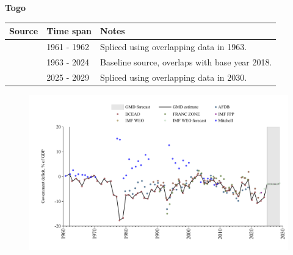 \documentclass[12pt,a4paper,landscape]{article}
\begin{document}
\begin{adjustbox}{max totalsize={\paperwidth}{\paperheight},center}
\begin{minipage}[t][\textheight][t]{\textwidth}
\vspace*{0.5cm}
{}
\begin{center}
{\Large\bfseries Togo}
\end{center}
\vspace{0.5cm}
\begin{table}[H]
\centering
\small
\begin{tabular}{|l|l|l|}
\hline
\textbf{Source} & \textbf{Time span} & \textbf{Notes} \\
\hline
\rowcolor{white}\cite{Mitchell}& 1961 - 1962 &Spliced using overlapping data in 1963.\\
\rowcolor{lightgray}\cite{BCEAO}& 1963 - 2024 &Baseline source, overlaps with base year 2018.\\
\rowcolor{white}\cite{IMF_WEO_forecast}& 2025 - 2029 &Spliced using overlapping data in 2030.\\
\hline
\end{tabular}
\end{table}
\begin{figure}[H]
\centering
\includegraphics[width=\textwidth,height=0.6\textheight,keepaspectratio]{graphs/TGO_govdef_GDP.pdf}
\end{figure}
\end{minipage}
\end{adjustbox}
\end{document}
